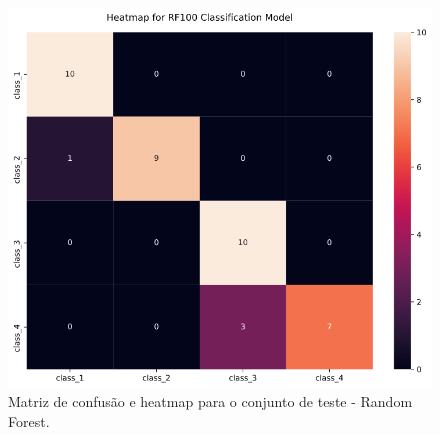 \documentclass[
	article,			%
	11pt,				%
	oneside,			%
	a4paper,			%
	english,			%
	brazil,				%
	sumario=tradicional
	]{abntex2}
\begin{document}
\begin{figure}[H]
 \centering
 \includegraphics[scale=0.5]{fig/rf_cm.png}
 \caption{Matriz de confusão e heatmap para o conjunto de teste - Random Forest.}
 \label{fig:rf_cm}
\end{figure}
\end{document}
